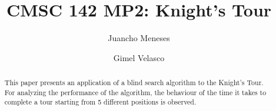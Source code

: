 \documentclass[sigconf]{acmart}
\begin{document}
\title{CMSC 142 MP2: Knight's Tour}



\author{Juancho Meneses}


\author{Gimel Velasco}




\begin{abstract}
This paper presents an application of a blind search algorithm to the Knight's Tour. For analyzing the performance of the algorithm, the behaviour
of the time it takes to complete a tour starting from 5 different positions is observed.

\end{abstract}



\maketitle




\nocite{back1}
 
\end{document}
